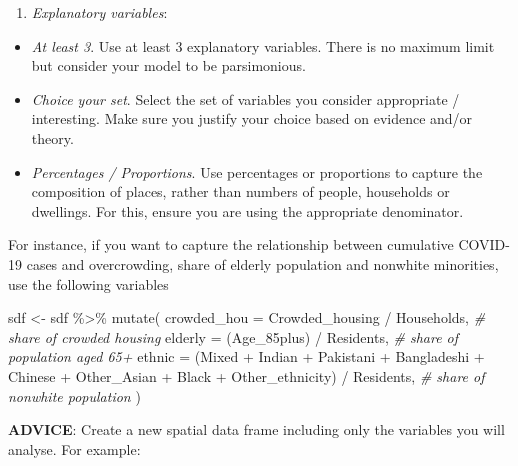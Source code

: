 \documentclass[
]{book}
\newenvironment{Shaded}{\begin{snugshade}}{\end{snugshade}}
\newcommand{\AttributeTok}[1]{\textcolor[rgb]{0.77,0.63,0.00}{#1}}
\newcommand{\CommentTok}[1]{\textcolor[rgb]{0.56,0.35,0.01}{\textit{#1}}}
\newcommand{\FunctionTok}[1]{\textcolor[rgb]{0.00,0.00,0.00}{#1}}
\newcommand{\NormalTok}[1]{#1}
\newcommand{\OtherTok}[1]{\textcolor[rgb]{0.56,0.35,0.01}{#1}}
\newcommand{\SpecialCharTok}[1]{\textcolor[rgb]{0.00,0.00,0.00}{#1}}
\providecommand{\tightlist}{%
  \setlength{\itemsep}{0pt}\setlength{\parskip}{0pt}}
\begin{document}
\begin{enumerate}
\def\labelenumi{\arabic{enumi}.}
\setcounter{enumi}{1}
\tightlist
\item
  \emph{Explanatory variables}:
\end{enumerate}

\begin{itemize}
\item
  \emph{At least 3}. Use at least 3 explanatory variables. There is no maximum limit but consider your model to be parsimonious.
\item
  \emph{Choice your set}. Select the set of variables you consider appropriate / interesting. Make sure you justify your choice based on evidence and/or theory.
\item
  \emph{Percentages / Proportions}. Use percentages or proportions to capture the composition of places, rather than numbers of people, households or dwellings. For this, ensure you are using the appropriate denominator.
\end{itemize}

For instance, if you want to capture the relationship between cumulative COVID-19 cases and overcrowding, share of elderly population and nonwhite minorities, use the following variables

\begin{Shaded}
\begin{Highlighting}[]
\NormalTok{sdf }\OtherTok{\textless{}{-}}\NormalTok{ sdf }\SpecialCharTok{\%\textgreater{}\%} \FunctionTok{mutate}\NormalTok{(}
  \AttributeTok{crowded\_hou =}\NormalTok{ Crowded\_housing }\SpecialCharTok{/}\NormalTok{ Households, }\CommentTok{\# share of crowded housing}
  \AttributeTok{elderly =}\NormalTok{ (Age\_85plus) }\SpecialCharTok{/}\NormalTok{ Residents, }\CommentTok{\# share of population aged 65+}
  \AttributeTok{ethnic =}\NormalTok{ (Mixed }\SpecialCharTok{+}\NormalTok{ Indian }\SpecialCharTok{+}\NormalTok{ Pakistani }\SpecialCharTok{+}\NormalTok{ Bangladeshi }\SpecialCharTok{+}\NormalTok{ Chinese }\SpecialCharTok{+}\NormalTok{ Other\_Asian }\SpecialCharTok{+}\NormalTok{ Black }\SpecialCharTok{+}\NormalTok{ Other\_ethnicity) }\SpecialCharTok{/}\NormalTok{ Residents, }\CommentTok{\# share of nonwhite population}
\NormalTok{)}
\end{Highlighting}
\end{Shaded}

\textbf{ADVICE}: Create a new spatial data frame including only the variables you will analyse. For example:
\end{document}
